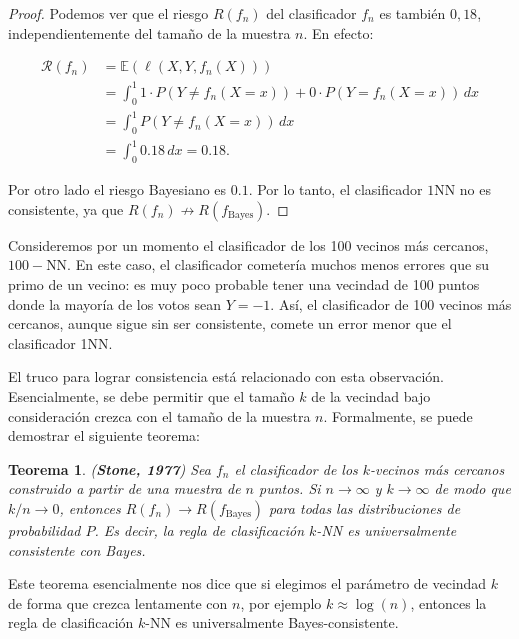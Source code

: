 \documentclass{report}
\newtheorem{thm}{Teorema}[section]
\begin{document}
\begin{proof}
Podemos ver que el riesgo \(R(f_n)\) del clasificador \(f_n\) es también $0,18$,
independientemente del tamaño de la muestra $n$. En efecto:

\[
\begin{aligned}
    \mathcal{R}(f_n) & = \mathbb{E}(\ell(X,Y,f_n(X))) \\
    & = \int_{0}^{1} 1\cdot P(Y \neq f_n(X=x)) + 0 \cdot P(Y = f_n(X=x)) \, dx \\
    & = \int_{0}^{1} P(Y \neq f_n(X=x)) \, dx \\
    & = \int_{0}^{1} 0.18 \, dx = 0.18.
\end{aligned}
\]

Por otro lado el riesgo Bayesiano es $0.1$. Por lo tanto, el clasificador $1$NN no es consistente, ya que 
\(R(f_n) \not\to R(f_{\text{Bayes}})\).\newline
\end{proof}

Consideremos por un momento el clasificador de los 100 vecinos 
más cercanos, $100-$NN. En este caso, el clasificador cometería muchos menos errores que su primo de un vecino: 
es muy poco probable tener una vecindad de 100 puntos donde la mayoría de los votos sean \(Y = -1\). 
Así, el clasificador de 100 vecinos más cercanos, aunque sigue sin ser consistente, comete un error 
menor que el clasificador 1NN.\newline

El truco para lograr consistencia está relacionado con esta observación. Esencialmente, se debe permitir 
que el tamaño \(k\) de la vecindad bajo consideración crezca con el tamaño de la muestra \(n\). Formalmente, 
se puede demostrar el siguiente teorema:\newline


\begin{thm}(\textbf{Stone, 1977})
Sea \(f_n\) el clasificador de los \(k\)-vecinos más cercanos construido 
a partir de una muestra de \(n\) puntos. Si \(n \to \infty\) y \(k \to \infty\) de modo que \(k/n \to 0\), 
entonces \(R(f_n) \to R(f_{\text{Bayes}})\) para todas las distribuciones de probabilidad \(P\). 
Es decir, la regla de clasificación \(k\)-NN es universalmente consistente con Bayes.\newline
\end{thm}

Este teorema esencialmente nos dice que si elegimos el parámetro de vecindad \(k\) de forma que crezca 
lentamente con \(n\), por ejemplo \(k \approx \log(n)\), entonces la regla de clasificación \(k\)-NN es 
universalmente Bayes-consistente.\newline
\end{document}
